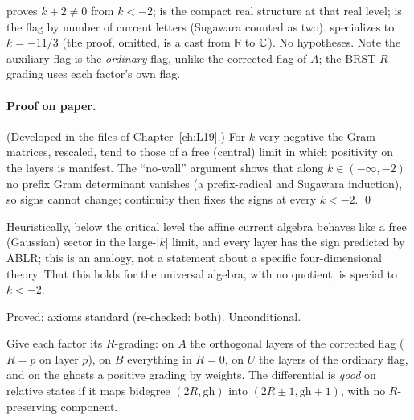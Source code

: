 \begin{dictionary}
 proves $k+2\ne0$ from $k<-2$;  is the compact real structure at that real level;
 is the flag by number of current letters (Sugawara counted as two).  specializes to $k=-11/3$
(the proof, omitted, is a cast from $\mathbb R$ to ${\mathbb{C}}$). No hypotheses. Note the auxiliary flag is the \emph{ordinary} flag, unlike the corrected flag of
$A$; the BRST $R$-grading uses each factor's own flag.
\end{dictionary}

\paragraph{Proof on paper.} (Developed in the files of Chapter~\ref{ch:L19}.) For $k$ very negative the Gram matrices, rescaled, tend to those of
a free (central) limit in which positivity on the layers is manifest. The ``no-wall'' argument shows that along $k\in(-\infty,-2)$ no prefix Gram
determinant vanishes (a prefix-radical and Sugawara induction), so signs cannot change; continuity then fixes the signs at every $k<-2$.
\qed

\begin{physics}
Heuristically, below the critical level the affine current algebra behaves like a free (Gaussian) sector in the large-$|k|$ limit, and every
layer has the sign predicted by ABLR; this is an analogy, not a statement about a specific four-dimensional theory. That this holds for the universal algebra, with no quotient, is special to $k<-2$.
\end{physics}

\begin{status}
Proved; axioms standard (re-checked: both). Unconditional.
\end{status}

\begin{definition}\label{l28:def:good}
Give each factor its $R$-grading: on $A$ the orthogonal layers of the corrected flag ($R=p$ on layer $p$), on $B$ everything in $R=0$, on $U$ the
layers of the ordinary flag, and on the ghosts a positive grading by weights. The differential is \emph{good} on relative states if it maps
bidegree $(2R,\mathrm{gh})$ into $(2R\pm1,\mathrm{gh}+1)$, with no $R$-preserving component.
\end{definition}

